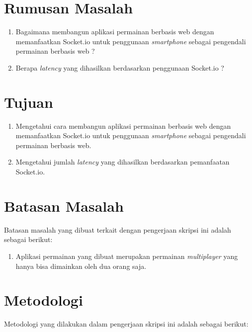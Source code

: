 \section{Rumusan Masalah}
\label{sec:rumusan}

\begin{enumerate}
	\item Bagaimana membangun aplikasi permainan berbasis web dengan memanfaatkan Socket.io untuk penggunaan \textit{smartphone} sebagai pengendali permainan berbasis web ?
	\item Berapa \textit{latency} yang dihasilkan berdasarkan penggunaan Socket.io ? 
\end{enumerate}


\section{Tujuan}
\label{sec:tujuan}
\begin{enumerate}
	\item Mengetahui cara membangun aplikasi permainan berbasis web dengan memanfaatkan Socket.io untuk penggunaan \textit{smartphone} sebagai pengendali permainan berbasis web.
	\item Mengetahui jumlah \textit{latency} yang dihasilkan berdasarkan pemanfaatan Socket.io.
\end{enumerate}


\section{Batasan Masalah}
\label{sec:batasan}

Batasan masalah yang dibuat terkait dengan pengerjaan skripsi ini adalah sebagai berikut:

\begin{enumerate}
	\item Aplikasi permainan yang dibuat merupakan permainan \textit{multiplayer} yang hanya bisa dimainkan oleh dua orang saja.
\end{enumerate}


\section{Metodologi}
\label{sec:metlit}
Metodologi yang dilakukan dalam pengerjaan skripsi ini adalah sebagai berikut:

